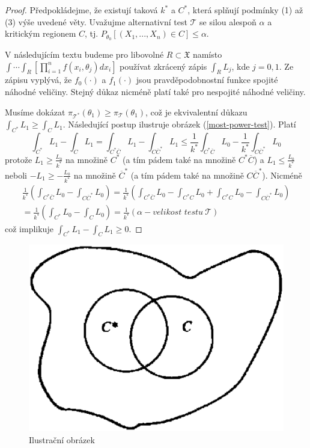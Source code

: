 \begin{proof}
Předpokládejme, že existují taková $k^*$ a $C^*$, která splňují podmínky (1) až (3) výše uvedené věty. Uvažujme alternativní test $\mathscr{T}$ se silou alespoň $\alpha$ a kritickým regionem $C$, tj. $P_{\theta_0}[(X_1, ..., X_n) \in C] \le \alpha$.

V následujícím textu budeme pro libovolné $R \subset \mathfrak{X}$ namísto $\int \cdots \int_{R}\left[\prod_{i = 1}^n f(x_i, \theta_j)dx_i\right]$ používat zkrácený zápis $\int_R L_j$, kde $j = 0, 1$. Ze zápisu vyplývá, že $f_0(\cdot)$ a $f_1(\cdot)$ jsou pravděpodobnostní funkce spojité náhodné veličiny. Stejný důkaz nicméně platí také pro nespojité náhodné veličiny.

Musíme dokázat $\pi_{\mathscr{T}^*}(\theta_1) \ge \pi_{\mathscr{T}}(\theta_1)$, což je ekvivalentní důkazu $\int_{C^*} L_1 \ge \int_C L_1$. Následující postup ilustruje obrázek (\ref{most-power-test}). Platí
\begin{equation*}
\int_{C^*}L_1 - \int_C L_1 = \int_{C^* \overline{C}}L_1 - \int_{C \overline{C}^*}L_1 \le \frac{1}{k^*}\int_{C^* \overline{C}}L_0 - \frac{1}{k^*}\int_{C \overline{C}^*}L_0
\end{equation*}
protože $L_1 \ge \frac{L_0}{k^*}$ na množině $C^*$ (a tím pádem také na množině $C^* \overline{C}$) a $L_1 \le \frac{L_0}{k^*}$ neboli $-L_1 \ge -\frac{L_0}{k^*}$ na množině $\overline{C}^*$ (a tím pádem také na množině $C \overline{C}^*$). Nicméně
\begin{multline*}
\frac{1}{k^*}\left(\int_{C^* \overline{C}}L_0 - \int_{C\overline{C}^*}L_0\right) = \frac{1}{k^*}\left(\int_{C^*\overline{C}}L_0 - \int_{C^* C}L_0 + \int_{C^* C}L_0 - \int_{C \overline{C}^*}L_0\right)\\
= \frac{1}{k^*}\left(\int_{C^*} L_0 - \int_C L_0 \right) = \frac{1}{k^*}(\alpha - \textit{velikost testu} ~ \mathscr{T})
\end{multline*}
což implikuje $\int_{C^*}L_1 - \int_C L_1 \ge 0$.
\end{proof}

\begin{figure}[htp]
\centering
\includegraphics[scale = 0.5]{pictures/most_powerful_test.eps}
\caption{Ilustrační obrázek}
\label{power-function}
\end{figure}

